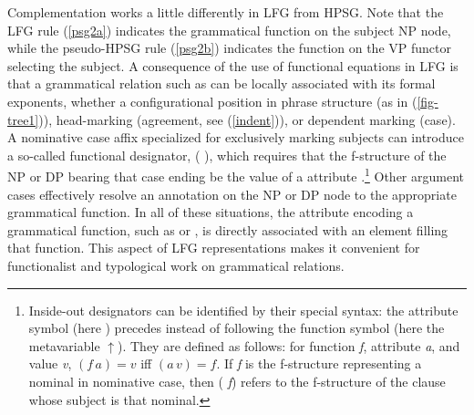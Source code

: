 Complementation works a little differently in LFG from HPSG.  Note that the LFG  rule (\ref{psg2a}) indicates the  grammatical function on the subject NP node, while the pseudo-HPSG rule (\ref{psg2b}) indicates the  function on the VP functor selecting the subject.   A consequence of the use of functional equations in LFG is that a grammatical relation such as  can be locally associated with its formal exponents, whether a configurational position in phrase structure (as in (\ref{fig-tree1})), head-marking (agreement, see (\ref{indent})), or dependent marking (case).  A nominative case affix specialized for exclusively marking subjects can introduce a so-called  functional designator, ( \Up),
 which requires that the f-structure of the NP or DP bearing that case ending be the value of a  attribute \citep{Nordlinger98a-u}.\footnote{Inside-out designators can be identified by their special syntax: the attribute symbol (here ) precedes instead of following the function symbol (here the metavariable $\uparrow$).  
They are defined as follows:  for function \textit{f}, attribute \textit{a}, and value \textit{v}, $(f \, a) = v$ iff $(a \, v) = f$. If \textit{f} is the f-structure representing a nominal in nominative case, then ( \textit{f}) refers to the f-structure of the clause whose subject is that nominal.}  Other argument cases effectively resolve an annotation on the NP or DP node to the appropriate grammatical function.  In all of these situations, the attribute encoding a grammatical function, such as  or , is directly associated with an element filling that function.  This aspect of LFG representations makes it convenient for functionalist and typological work on grammatical relations.  


 
